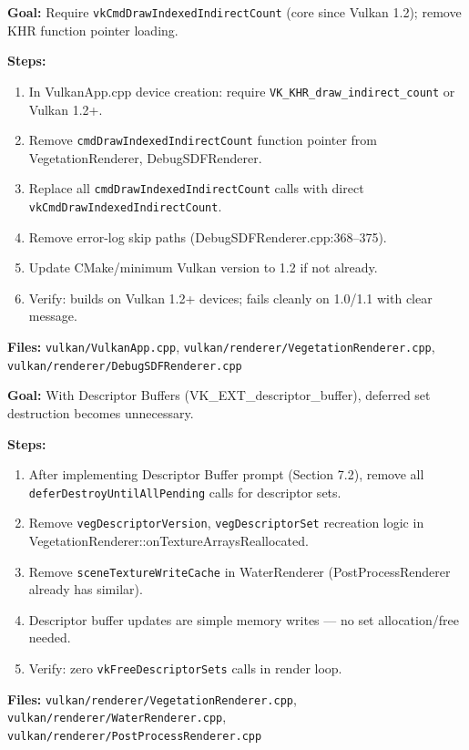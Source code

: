 \documentclass[11pt,a4paper]{article}
\begin{document}
\begin{tcolorbox}[promptbox={Prompt: Remove Indirect Draw Count Fallback}]
\textbf{Goal:} Require \texttt{vkCmdDrawIndexedIndirectCount} (core since Vulkan 1.2); remove KHR function pointer loading.

\textbf{Steps:}
\begin{enumerate}
    \item In VulkanApp.cpp device creation: require \texttt{VK\_KHR\_draw\_indirect\_count} or Vulkan 1.2+.
    \item Remove \texttt{cmdDrawIndexedIndirectCount} function pointer from VegetationRenderer, DebugSDFRenderer.
    \item Replace all \texttt{cmdDrawIndexedIndirectCount} calls with direct \texttt{vkCmdDrawIndexedIndirectCount}.
    \item Remove error-log skip paths (DebugSDFRenderer.cpp:368–375).
    \item Update CMake/minimum Vulkan version to 1.2 if not already.
    \item Verify: builds on Vulkan 1.2+ devices; fails cleanly on 1.0/1.1 with clear message.
\end{enumerate}

\textbf{Files:} \texttt{vulkan/VulkanApp.cpp}, \texttt{vulkan/renderer/VegetationRenderer.cpp}, \texttt{vulkan/renderer/DebugSDFRenderer.cpp}
\end{tcolorbox}

\begin{tcolorbox}[promptbox={Prompt: Remove Descriptor Set Deferred Destruction Fallback}]
\textbf{Goal:} With Descriptor Buffers (VK\_EXT\_descriptor\_buffer), deferred set destruction becomes unnecessary.

\textbf{Steps:}
\begin{enumerate}
    \item After implementing Descriptor Buffer prompt (Section 7.2), remove all \texttt{deferDestroyUntilAllPending} calls for descriptor sets.
    \item Remove \texttt{vegDescriptorVersion}, \texttt{vegDescriptorSet} recreation logic in VegetationRenderer::onTextureArraysReallocated.
    \item Remove \texttt{sceneTextureWriteCache} in WaterRenderer (PostProcessRenderer already has similar).
    \item Descriptor buffer updates are simple memory writes — no set allocation/free needed.
    \item Verify: zero \texttt{vkFreeDescriptorSets} calls in render loop.
\end{enumerate}

\textbf{Files:} \texttt{vulkan/renderer/VegetationRenderer.cpp}, \texttt{vulkan/renderer/WaterRenderer.cpp}, \texttt{vulkan/renderer/PostProcessRenderer.cpp}
\end{tcolorbox}
\end{document}
